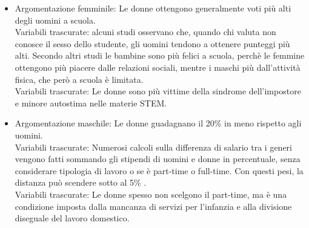 \documentclass[12pt]{book} %
\begin{document}
\begin{mdframed}[linewidth=1pt]
\begin{itemize}
\\Variabili trascurate: Gli uomini si sentono meno liberi di scegliere materie umanistiche, che potrebbero arricchirli, per condizionamenti sociali che richiedono di prendersi cura della famiglia e, in alcuni contesti, si sente in dovere di guadagnare più della donna.
\item Argomentazione femminile: Le donne ottengono generalmente voti più alti degli uomini a scuola. 
\\Variabili trascurate: alcuni studi osservano che, quando chi valuta non conosce il sesso dello studente, gli uomini tendono a ottenere punteggi più alti. Secondo altri studi le bambine sono più felici a scuola, perchè le femmine ottengono più piacere dalle relazioni sociali, mentre i maschi più dall'attività fisica, che però a scuola è limitata.
\\Variabili trascurate: Le donne sono più vittime della sindrome dell’impostore e minore autostima nelle materie STEM.
\item Argomentazione maschile: Le donne guadagnano il 20\% in meno rispetto agli uomini.
\\Variabili trascurate: Numerosi calcoli sulla differenza di salario tra i generi vengono fatti sommando gli stipendi di uomini e donne in percentuale, senza considerare tipologia di lavoro o se è part-time o full-time. Con questi pesi, la distanza può scendere sotto al 5\% .
\\Variabili trascurate: Le donne spesso non scelgono il part-time, ma è una condizione imposta dalla mancanza di servizi per l'infanzia e alla divisione diseguale del lavoro domestico.

\end{itemize}
\end{mdframed}
\end{document}
